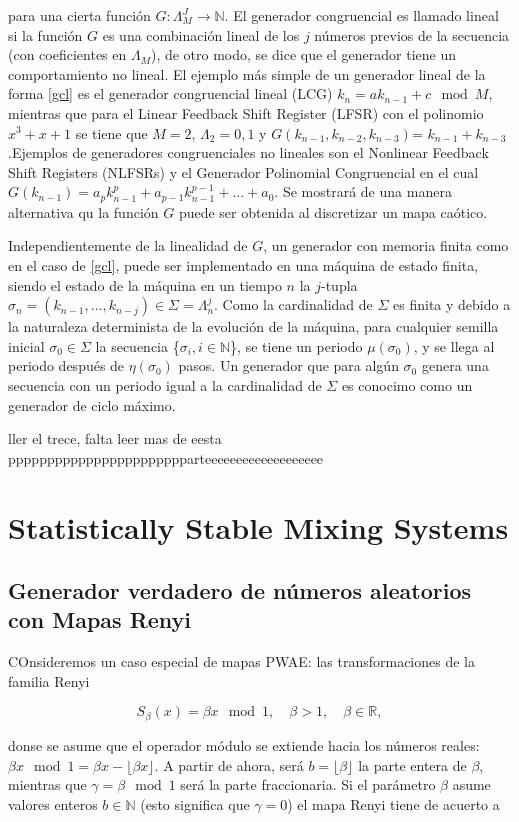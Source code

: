 para una cierta función $G: \Lambda _{M}^{J} \longrightarrow \mathbb{N}$. El generador congruencial es llamado lineal si la función $G$ es una combinación lineal de los $j$ números previos de la secuencia (con coeficientes en $\Lambda_{M}$), de otro modo, se dice que el generador tiene un comportamiento no lineal. El ejemplo más simple de un generador lineal de la forma \eqref{gcl} es el generador congruencial lineal (LCG) $k_{n}= ak_{n-1}+c \mod{M}$, mientras que para el Linear Feedback Shift Register (LFSR) con el polinomio $x^{3}+x+1$ se tiene que $M=2$, $\Lambda_{2}={0,1}$ y $G(k_{n-1}, k_{n-2}, k_{n-3})$= $k_{n-1}+ k_{n-3}$.Ejemplos de generadores congruenciales no lineales son el Nonlinear Feedback Shift Registers (NLFSRs) y el Generador Polinomial Congruencial en el cual $G(k_{n-1})= a_{p}k^{p}_{n-1}+ a_{p-1}k^{p-1}_{n-1}+...+a_{0}$. Se mostrará de una manera alternativa qu la función $G$ puede ser obtenida al discretizar un mapa caótico.

Independientemente de la linealidad de $G$, un generador con memoria finita como en el caso de \eqref{gcl}, puede ser implementado en una máquina de estado finita, siendo el estado de la máquina en un tiempo $n$ la $j$-tupla $\sigma_{n}= (k_{n-1},...,k_{n-j}) \in \Sigma = \Lambda_{n}^{j}$. Como la cardinalidad de $\Sigma$ es finita y debido a la naturaleza determinista de la evolución de la máquina, para cualquier semilla inicial $\sigma_{0} \in \Sigma$  la secuencia \{$\sigma_{i}, i \in \mathbb{N}$\}, se tiene un periodo $\mu(\sigma_{0})$, y se llega al periodo después de $\eta(\sigma_{0})$ pasos. Un generador que para algún $\sigma_{0}$ genera una secuencia con un periodo igual a la cardinalidad de $\Sigma$ es conocimo como un generador de ciclo máximo.



ller el  trece, falta leer mas de eesta ppppppppppppppppppppppparteeeeeeeeeeeeeeeeeee
\section{Statistically Stable Mixing Systems}
\subsection{Generador verdadero de números aleatorios con Mapas Renyi}

COnsideremos un caso especial de mapas PWAE: las transformaciones de la familia Renyi

\begin{equation}
S_{\beta}(x)= \beta x \mod{1}, \quad \beta > 1, \quad \beta \in \mathbb{R},
\end{equation} 

donse se asume que el operador módulo se extiende hacia los números reales: $ \beta x \mod{1} =    \beta x   - \lfloor\beta x  \rfloor $. A partir de ahora, será $b= \lfloor \beta \rfloor$ la parte entera de $\beta$, mientras que $ \gamma = \beta \mod{1} $ será la parte fraccionaria. Si el parámetro $\beta$ asume valores enteros $b \in \mathbb{N}$ (esto significa que $\gamma =0 $) el mapa Renyi tiene de acuerto a 
\cite{Addabbo}